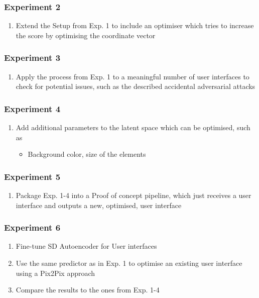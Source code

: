 \documentclass[10pt,a4paper]{scrartcl} %
\begin{document}
\subsubsection{Experiment 2}
\begin{enumerate}
    \item Extend the Setup from Exp. 1 to include an optimiser which tries to increase the score by optimising the coordinate vector
\end{enumerate}
\subsubsection{Experiment 3}
\begin{enumerate}
    \item Apply the process from Exp. 1 to a meaningful number of user interfaces to check for potential issues, such as the described accidental adversarial attacks
\end{enumerate}
\subsubsection{Experiment 4}
\begin{enumerate}
    \item Add additional parameters to the latent space which can be optimised, such as
    \begin{itemize}
        \item Background color, size of the elements
    \end{itemize}
\end{enumerate}
\subsubsection{Experiment 5}
\begin{enumerate}
    \item Package Exp. 1-4 into a Proof of concept pipeline, which just receives a user interface and outputs a new, optimised, user interface
\end{enumerate}
\subsubsection{Experiment 6}
\begin{enumerate}
    \item Fine-tune SD Autoencoder for User interfaces
    \item Use the same predictor as in Exp. 1 to optimise an existing user interface using a Pix2Pix approach
    \item Compare the results to the ones from Exp. 1-4
\end{enumerate}
\
\pagebreak
\end{document}
